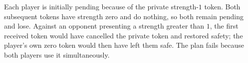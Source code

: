 Each player is initially pending because of the private strength-$1$ token. Both subsequent tokens have strength zero and do nothing, so both remain pending and lose. Against an opponent presenting a strength greater than $1$, the first received token would have cancelled the private token and restored safety; the player's own zero token would then have left them safe. The plan fails because both players use it simultaneously.
